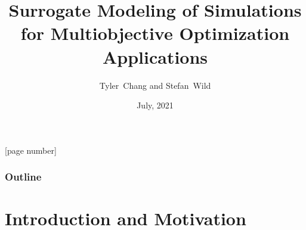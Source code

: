 \documentclass[aspectratio=169]{beamer}
\title{Surrogate Modeling of Simulations for Multiobjective Optimization Applications}
\author{Tyler~Chang and Stefan~Wild}
\date{July, 2021}
\institute{Mathematics and Computer Science Division\\
Argonne National Laboratory}
\begin{document}
{
\frame{\titlepage}
}

[page number]{}

\begin{frame}
  \frametitle{Outline}
  \tableofcontents
\end{frame}

\section{Introduction and Motivation}

\end{document}
